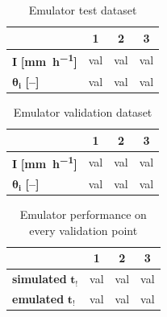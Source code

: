 \begin{table}[H]
  \centering
  \caption{Emulator test dataset}
  \label{tab:test_dataset}
  \begin{tabular}{lccc}
    \toprule
     & \textbf{1} & \textbf{2} & \textbf{3}\\
    \midrule
    $\bm{I}$ \textbf{[\si{\milli\meter\per\hour}]} & val & val & val \\
    $\bm{\theta_i}$ \textbf{[--]} & val & val & val \\
    \bottomrule
  \end{tabular}
\end{table}


\begin{table}[H]
  \centering
  \caption{Emulator validation dataset}
  \label{tab:validation_dataset}
  \begin{tabular}{lccc}
    \toprule
     & \textbf{1} & \textbf{2} & \textbf{3}\\
    \midrule
    $\bm{I}$ \textbf{[\si{\milli\meter\per\hour}]} & val & val & val \\
    $\bm{\theta_i}$ \textbf{[--]} & val & val & val \\
    \bottomrule
  \end{tabular}
\end{table}


\begin{table}[H]
  \centering
  \caption{Emulator performance on every validation point}
  \label{tab:validation_performance}
  \begin{tabular}{lccc}
    \toprule
     & \textbf{1} & \textbf{2} & \textbf{3}\\
    \midrule
    \textbf{simulated} $\bm{t_!}$ & val & val & val \\
    \textbf{emulated} $\bm{t_!}$ & val & val & val \\
    \bottomrule
  \end{tabular}
\end{table}
